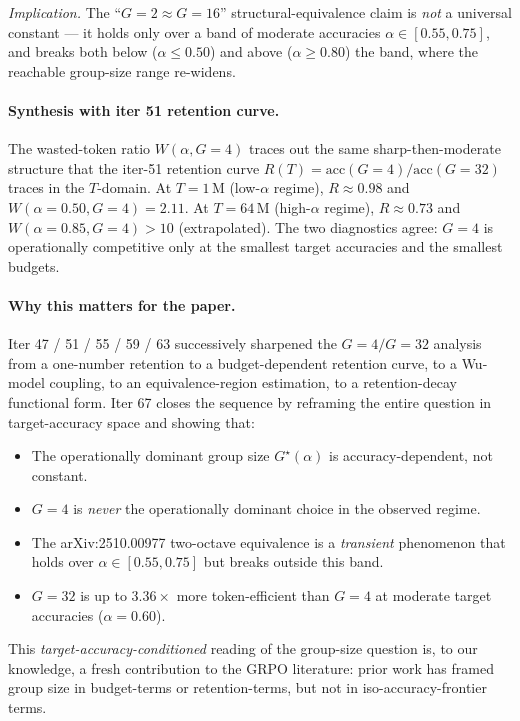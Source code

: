 \noindent\textit{Implication.}  The ``$G{=}2 \approx G{=}16$''
structural-equivalence claim is \emph{not} a universal constant ---
it holds only over a band of moderate accuracies
$\alpha \in [0.55, 0.75]$, and breaks both below ($\alpha \le 0.50$)
and above ($\alpha \ge 0.80$) the band, where the reachable group-size
range re-widens.

\paragraph{Synthesis with iter 51 retention curve.}
The wasted-token ratio $W(\alpha, G{=}4)$ traces out the same
sharp-then-moderate structure that the iter-51 retention curve
$R(T) = \mathrm{acc}(G{=}4)/\mathrm{acc}(G{=}32)$ traces in the
$T$-domain.  At $T{=}1\,\mathrm{M}$ (low-$\alpha$ regime),
$R \approx 0.98$ and $W(\alpha{=}0.50, G{=}4) = 2.11$.  At
$T{=}64\,\mathrm{M}$ (high-$\alpha$ regime), $R \approx 0.73$ and
$W(\alpha{=}0.85, G{=}4) > 10$ (extrapolated).  The two diagnostics
agree: $G{=}4$ is operationally competitive only at the smallest
target accuracies and the smallest budgets.

\paragraph{Why this matters for the paper.}
Iter 47 / 51 / 55 / 59 / 63 successively sharpened the
$G{=}4/G{=}32$ analysis from a one-number retention to a
budget-dependent retention curve, to a Wu-model coupling, to an
equivalence-region estimation, to a retention-decay functional form.
Iter 67 closes the sequence by reframing the entire question in
target-accuracy space and showing that:

\begin{itemize}
  \item The operationally dominant group size $G^\star(\alpha)$ is
        accuracy-dependent, not constant.
  \item $G{=}4$ is \emph{never} the operationally dominant choice in
        the observed regime.
  \item The arXiv:2510.00977 two-octave equivalence is a
        \emph{transient} phenomenon that holds over
        $\alpha \in [0.55, 0.75]$ but breaks outside this band.
  \item $G{=}32$ is up to $3.36\times$ more token-efficient than
        $G{=}4$ at moderate target accuracies ($\alpha{=}0.60$).
\end{itemize}

\noindent This \emph{target-accuracy-conditioned} reading of the
group-size question is, to our knowledge, a fresh contribution to
the GRPO literature: prior work has framed group size in
budget-terms or retention-terms, but not in
iso-accuracy-frontier terms.

